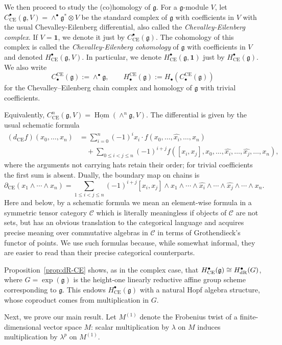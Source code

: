 \documentclass[12pt]{amsart}
\theoremstyle{remark}
\DeclareMathOperator{\Hom}{Hom}
\newcommand{\cC}{\mathcal C}
\newcommand{\g}{\mathfrak g}
\newcommand{\one}{\mathbf 1}
\newcommand{\CE}{\mathrm{CE}}
\newcommand{\uHom}{\underline{\Hom}}
\begin{document}
We then proceed to study the (co)homology of $\g$. 
For a $\g$-module $V$, let 
$C^\bullet_{\CE}(\g,V)=\wedge^\bullet \g^*\otimes V$ be the 
standard complex of $\g$ with coefficients in $V$ with the usual Chevalley-Eilenberg differential, also called the {\it Chevalley-Eilenberg complex}. 
If $V=\one$, we denote it just by $C^\bullet_{\CE}(\g)$. 
The cohomology of this complex is called the {\it Chevalley-Eilenberg cohomology} of $\g$ with coefficients in $V$ and denoted $H^\bullet_{\CE}(\g,V)$. 
In particular, we denote $H^\bullet_\CE(\g,\one)$ just by $H^\bullet_\CE(\g)$. 
We also write
\[
 C_\bullet^{\CE}(\g):=\wedge^\bullet\g,
 \qquad H_\bullet^{\CE}(\g):=H_\bullet(C_\bullet^{\CE}(\g))
\]
for the Chevalley--Eilenberg chain complex and homology of $\g$ with trivial
coefficients.

Equivalently, $C^n_{\CE}(\g,V)=\uHom(\wedge^n\g,V)$.  The differential is
given by the usual schematic formula
\[
\begin{aligned}
(d_{\CE}f)(x_0,\ldots,x_n)
 &=\sum_{i=0}^n(-1)^i x_i\cdot
 f(x_0,\ldots,\widehat{x_i},\ldots,x_n)\\
 &\quad+\sum_{0\leq i<j\leq n}(-1)^{i+j}
 f([x_i,x_j],x_0,\ldots,\widehat{x_i},\ldots,
 \widehat{x_j},\ldots,x_n),
\end{aligned}
\]
where the arguments not carrying hats retain their order; for trivial
coefficients the first sum is absent.  Dually, the boundary map on chains is
\[
 \partial_{\CE}(x_1\wedge\cdots\wedge x_n)
 =\sum_{1\leq i<j\leq n}(-1)^{i+j}[x_i,x_j]\wedge
 x_1\wedge\cdots\wedge\widehat{x_i}\wedge\cdots\wedge
 \widehat{x_j}\wedge\cdots\wedge x_n.
\]
Here and below, by a schematic formula we mean an element-wise formula 
in a symmetric tensor category $\cC$ which is literally meaningless if objects of $\cC$ are not sets, but 
has an obvious translation to the categorical language and acquires precise meaning over commutative algebras in $\cC$ in terms of Grothendieck's functor of points. We use such formulas because, while somewhat informal, they are easier to read than their 
precise categorical counterparts.

Proposition~\ref{prop:dR-CE} shows, as in the complex case, that
$H^\bullet_{\CE}(\g)\cong H^\bullet_{\rm dR}(G)$, where $G=\exp(\g)$
is the height-one linearly reductive affine group scheme corresponding to $\g$.
This endows $H^\bullet_{\CE}(\g)$ with a natural Hopf algebra structure, whose
coproduct comes from multiplication in $G$.
 
Next, we prove our main result. Let $M^{(1)}$ denote the Frobenius twist of a finite-dimensional vector space $M$: scalar multiplication by $\lambda$ on $M$ induces multiplication by $\lambda^p$ on $M^{(1)}$.
\end{document}
